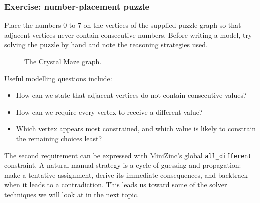 \documentclass[11pt]{article}
\begin{document}
\subsubsection{Exercise: number-placement puzzle}

Place the numbers $0$ to $7$ on the vertices of the supplied puzzle graph so
that adjacent vertices never contain consecutive numbers. Before writing a
model, try solving the puzzle by hand and note the reasoning strategies used.

\begin{figure}[H]
\centering
{}
\caption{The Crystal Maze graph.}
\label{fig:crystal-maze}
\end{figure}


Useful modelling questions include:
\begin{itemize}
    \item How can we state that adjacent vertices do not contain consecutive
    values?
    \item How can we require every vertex to receive a different value?
    \item Which vertex appears most constrained, and which value is likely to
    constrain the remaining choices least?
\end{itemize}

The second requirement can be expressed with MiniZinc's global
\texttt{all\_different} constraint. A natural manual strategy is a cycle of
guessing and propagation: make a tentative assignment, derive its immediate
consequences, and backtrack when it leads to a contradiction. This leads us toward some of the
solver techniques we will look at in the next topic.
\end{document}
